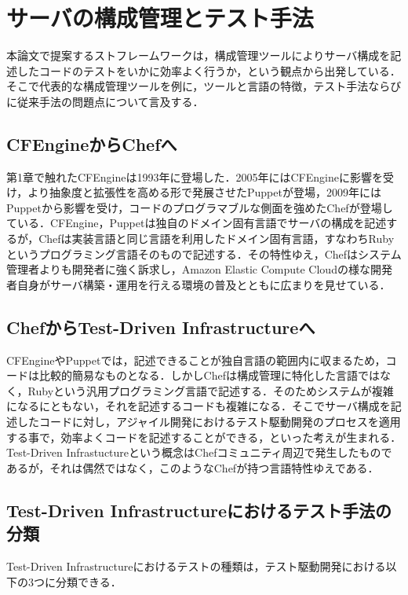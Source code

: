 \section{サーバの構成管理とテスト手法}

本論文で提案するストフレームワークは，構成管理ツールによりサーバ構成を記述したコードのテストをいかに効率よく行うか，という観点から出発している．そこで代表的な構成管理ツールを例に，ツールと言語の特徴，テスト手法ならびに従来手法の問題点について言及する．

\subsection{CFEngineからChefへ}

第1章で触れたCFEngineは1993年に登場した．2005年にはCFEngineに影響を受け，より抽象度と拡張性を高める形で発展させたPuppet\cite{puppet}が登場，2009年にはPuppetから影響を受け，コードのプログラマブルな側面を強めたChef\cite{chef}が登場している．CFEngine，Puppetは独自のドメイン固有言語でサーバの構成を記述するが，Chefは実装言語と同じ言語を利用したドメイン固有言語，すなわちRubyというプログラミング言語そのもので記述する．その特性ゆえ，Chefはシステム管理者よりも開発者に強く訴求し，Amazon Elastic Compute Cloud\cite{ec2}の様な開発者自身がサーバ構築・運用を行える環境の普及とともに広まりを見せている．

\subsection{ChefからTest-Driven Infrastructureへ}

CFEngineやPuppetでは，記述できることが独自言語の範囲内に収まるため，コードは比較的簡易なものとなる．しかしChefは構成管理に特化した言語ではなく，Ruby\cite{ruby}という汎用プログラミング言語で記述する．そのためシステムが複雑になるにともない，それを記述するコードも複雑になる．そこでサーバ構成を記述したコードに対し，アジャイル開発におけるテスト駆動開発のプロセスを適用する事で，効率よくコードを記述することができる，といった考えが生まれる．Test-Driven Infrastuctureという概念はChefコミュニティ周辺で発生したものであるが，それは偶然ではなく，このようなChefが持つ言語特性ゆえである．

\subsection{Test-Driven Infrastructureにおけるテスト手法の分類}

Test-Driven Infrastructureにおけるテストの種類は，テスト駆動開発における以下の3つに分類できる．

